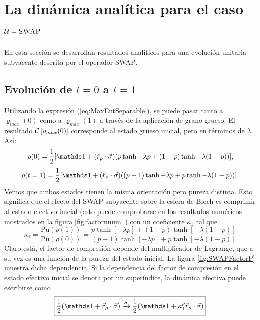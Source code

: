 \section{La dinámica analítica para el caso $\mathcal{U}=\textsc{SWAP}$}
En esta sección se desarrollan resultados analíticos para una evolución unitaria subyacente descrita por el operador \textsc{SWAP}.

\subsection{Evolución de $t=0$ a $t=1$}

Utilizando la expresión (\ref{eq:MaxEntSeparable}), se puede pasar tanto a $\varrho_{max}(0)$ como a $\varrho_{max}(1)$ a través de la aplicación de grano grueso. El resultado $\mathcal{C}\left[\varrho_{max}(0)\right]$ corresponde al estado grueso inicial, pero en términos de $\lambda$. Así:
\begin{equation}
\rho(0)=\frac{1}{2}[\Id+(\hat{r}_{\rho}\cdot\vec{\sigma})(p\tanh{-\lambda p}+(1-p)\tanh{-\lambda (1-p)})],
\end{equation}
\begin{equation}
\rho(t=1)=\frac{1}{2}[\Id+(\hat{r}_{\rho}\cdot\vec{\sigma})((p-1)\tanh{-\lambda p}+p\tanh{-\lambda (1-p)})].
\end{equation}
Vemos que ambos estados tienen la misma orientación pero pureza distinta. Esto significa que el efecto del \textsc{SWAP} subyacente sobre la esfera de Bloch es comprimir al estado efectivo inicial (esto puede comprobarse en los resultados numéricos mostrados en la figura \ref{fig:factornnum}.) con un coeficiente $\kappa_{1}$ tal que
\begin{equation}\label{eq:SWAPFactor}
  \kappa_{1}=\frac{\text{Pu}(\rho(1))}{\text{Pu}(\rho(0))}=\frac{p\tanh{[-\lambda p]}+(1-p)\tanh{[-\lambda (1-p)]}}{(p-1)\tanh{[-\lambda p]}+p\tanh{[-\lambda (1-p)]}}
\end{equation}
Claro está, el factor de compresión depende del multiplicador de Lagrange, que a su vez es una función de la pureza del estado inicial. La figura \ref{fig:SWAPFactorP} muestra dicha dependencia. Si la dependencia del factor de compresión en el estado efectivo inicial se denota por un superíndice, la dinámica efectiva puede escribirse como
\begin{equation}
  \boxed{\frac{1}{2}(\Id+\vec{r}_{\rho}\cdot\vec{\sigma}) \xrightarrow{S} \frac{1}{2}(\Id+\kappa_{1}^{\rho}\vec{r}_{\rho}\cdot\vec{\sigma})}
\end{equation}
